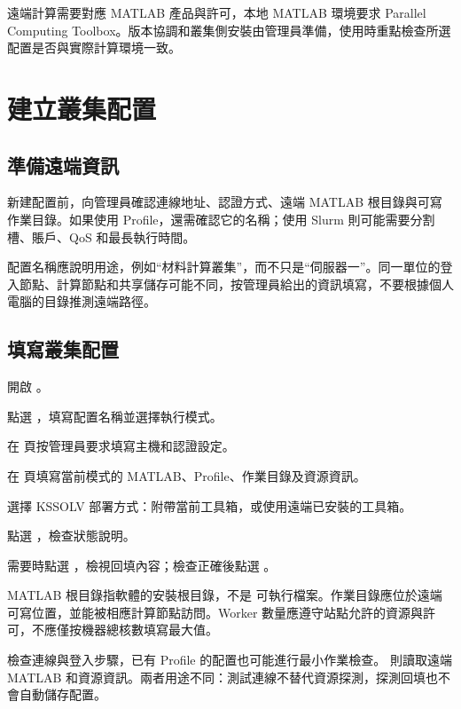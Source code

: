 遠端計算需要對應 MATLAB\regmark{} 產品與許可，本地 MATLAB\regmark{} 環境要求 Parallel Computing Toolbox。版本協調和叢集側安裝由管理員準備，使用時重點檢查所選配置是否與實際計算環境一致。

\section{建立叢集配置}

\subsection{準備遠端資訊}

新建配置前，向管理員確認連線地址、認證方式、遠端 MATLAB\regmark{} 根目錄與可寫作業目錄。如果使用 Profile，還需確認它的名稱；使用 Slurm 則可能需要分割槽、賬戶、QoS 和最長執行時間。

配置名稱應說明用途，例如“材料計算叢集”，而不只是“伺服器一”。同一單位的登入節點、計算節點和共享儲存可能不同，按管理員給出的資訊填寫，不要根據個人電腦的目錄推測遠端路徑。

\subsection{填寫叢集配置}

\begin{steps}
\item 開啟 。
\item 點選 ，填寫配置名稱並選擇執行模式。
\item 在  頁按管理員要求填寫主機和認證設定。
\item 在  頁填寫當前模式的 MATLAB\regmark{}、Profile、作業目錄及資源資訊。
\item 選擇 KSSOLV 部署方式：附帶當前工具箱，或使用遠端已安裝的工具箱。
\item 點選 ，檢查狀態說明。
\item 需要時點選 ，檢視回填內容；檢查正確後點選 。
\end{steps}

MATLAB\regmark{} 根目錄指軟體的安裝根目錄，不是  可執行檔案。作業目錄應位於遠端可寫位置，並能被相應計算節點訪問。Worker 數量應遵守站點允許的資源與許可，不應僅按機器總核數填寫最大值。

 檢查連線與登入步驟，已有 Profile 的配置也可能進行最小作業檢查。 則讀取遠端 MATLAB\regmark{} 和資源資訊。兩者用途不同：測試連線不替代資源探測，探測回填也不會自動儲存配置。

